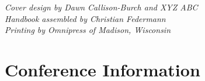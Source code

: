 \documentclass[twoside,makeidx]{book}
\begin{document}


\fancyfoot[C]{}





\cleardoublepage
\thispagestyle{empty}
\vspace*{6in}
\noindent\emph{Cover design by Dawn Callison-Burch and XYZ ABC}\\
\noindent\emph{Handbook assembled by Christian Federmann}\\
\emph{Printing by Omnipress of Madison, Wisconsin}

\newpage
\cleardoublepage
\fancyfoot[C]{\thepage}
\frontmatter





\setcounter{tocdepth}{2}
\tableofcontents
\mainmatter
\pagestyle{fancy}


\clearpage
\setheaders{}{}



\chapter{Conference Information}


\clearpage


\clearpage%
\setheaders{}{}


%
\clearpage%
\setheaders{}{}
\end{document}
